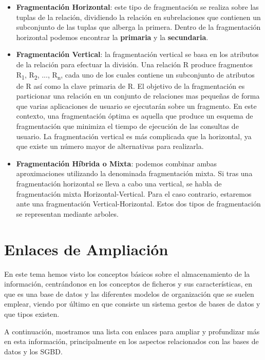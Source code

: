 \begin{itemize}
    \item \textbf{Fragmentación Horizontal}: este tipo de fragmentación se realiza sobre las tuplas de la relación, dividiendo la relación en subrelaciones que contienen un subconjunto de las tuplas que alberga la primera. Dentro de la fragmentación horizontal podemos encontrar la \textbf{primaria} y la \textbf{secundaria}.

    \item \textbf{Fragmentación Vertical}: la fragmentación vertical se basa en los atributos de la relación para efectuar la división. Una relación R produce fragmentos  R\textsubscript{1}, R\textsubscript{2}, ..., R\textsubscript{n}, cada uno de los cuales contiene un subconjunto de atributos de R así como la clave primaria de R. El objetivo de la fragmentación es particionar una relación en un conjunto de relaciones mas pequeñas de forma que varias aplicaciones de usuario se ejecutarán sobre un fragmento. En este contexto, una fragmentación óptima es aquella que produce un esquema de fragmentación que minimiza el tiempo de ejecución de las consultas de usuario. La fragmentación vertical es más complicada que la horizontal, ya que existe un número mayor de alternativas para realizarla.

    \item \textbf{Fragmentación Híbrida o Mixta}: podemos combinar ambas aproximaciones utilizando la denominada fragmentación mixta. Si tras una fragmentación horizontal se lleva a cabo una vertical, se habla de fragmentación mixta Horizontal-Vertical. Para el caso contrario, estaremos ante una fragmentación Vertical-Horizontal. Estos dos tipos de fragmentación se representan mediante arboles.
\end{itemize}

\section{Enlaces de Ampliación}
 En este tema hemos visto los conceptos básicos sobre el almacenamiento de la información, centrándonos en los conceptos de ficheros y sus características, en que es una base de datos y las diferentes modelos de organización que se suelen emplear, viendo por último en que consiste un sistema gestos de bases de datos y que tipos existen.

 A continuación, mostramos una lista con enlaces para ampliar y profundizar más en esta información, principalmente en los aspectos relacionados con las bases de datos y los SGBD.

